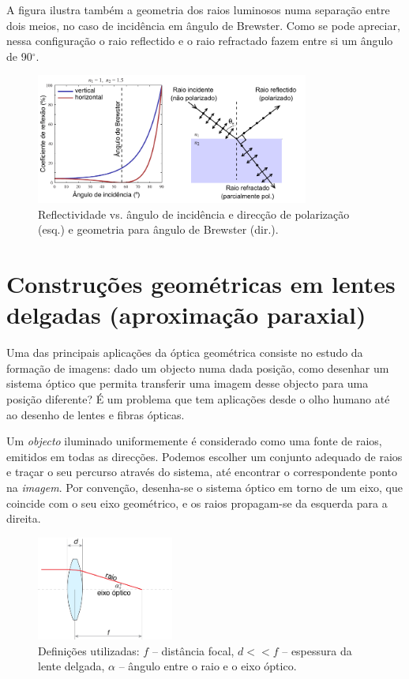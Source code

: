 \documentclass[a4paper,12pt]{article}      %
\begin{document}
A figura ilustra também a geometria dos raios luminosos numa separação entre dois meios, no caso de incidência em ângulo de Brewster. Como se pode apreciar, nessa configuração o raio reflectido e o raio refractado fazem entre si um ângulo de 90$^\circ$.

\begin{figure}
	[!hb]  \centering 
	\includegraphics[width=0.8\textwidth]{2-brewster}
	\caption{Reflectividade vs. ângulo de incidência e direcção de polarização (esq.) e geometria para ângulo de Brewster (dir.). \label{fig:brewster}} 
\end{figure}



\section{\sf Construções geométricas em lentes delgadas (aproximação paraxial)}

Uma das principais aplicações da óptica geométrica consiste no estudo da formação de imagens: dado um objecto numa dada posição, como desenhar um sistema óptico que permita transferir uma imagem desse objecto para uma posição diferente? É um problema que tem aplicações desde o olho humano até ao desenho de lentes e fibras ópticas.

 Um \emph{objecto} iluminado uniformemente é considerado como uma fonte de raios, emitidos em todas as direcções. Podemos escolher um conjunto adequado de raios e traçar o seu percurso através do sistema, até encontrar o correspondente ponto na \emph{imagem}. Por convenção, desenha-se o sistema óptico em torno de um eixo, que coincide com o seu eixo geométrico, e os raios propagam-se da esquerda para a direita. 

\begin{figure}
	[!hb]  \centering 
	\includegraphics[width=0.4\textwidth]{2-definicoes}
 	\caption{\label{fig:fig2} Definições utilizadas: $f$ -- distância focal, $d<<f$ -- espessura da lente delgada, $\alpha$ -- ângulo entre o raio e o eixo óptico.} 
\end{figure}
\end{document}
